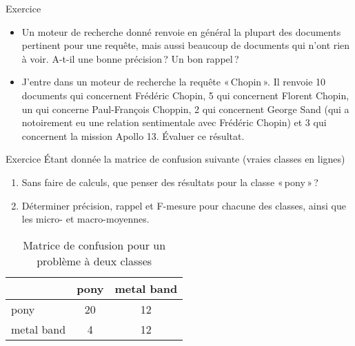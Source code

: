 \documentclass[xcolor={svgnames}, french]{beamer}
\title{\titlepagetitle}
\subtitle{\titlepagesubtitle}
\author{\textbf{\myname} (\mylab)}
\institute{}
\date{\tiny Version {\yyyymmdddate\today}T\currenttime}
\begin{document}

\begin{frame}[plain]
	\titlepage %
\end{frame}


\begin{frame}{Exercice}
	\begin{itemize}
		\item Un moteur de recherche donné renvoie en général la plupart des documents pertinent pour une requête, mais aussi beaucoup de documents qui n'ont rien à voir. A-t-il une bonne précision ? Un bon rappel ?
		\item J'entre dans un moteur de recherche la requête « Chopin ». Il renvoie \num{10} documents qui concernent Frédéric Chopin, \num{5} qui concernent Florent Chopin, un qui concerne Paul-François Choppin, \num{2} qui concernent George Sand (qui a notoirement eu une relation sentimentale avec Frédéric Chopin) et \num{3} qui concernent la mission Apollo 13. Évaluer ce résultat.
	\end{itemize}
\end{frame}

\begin{frame}[fragile=singleslide]{Exercice}
	Étant donnée la matrice de confusion suivante (vraies classes en lignes)
	\begin{enumerate}
		\item Sans faire de calculs, que penser des résultats pour la classe « pony » ?
		\item Déterminer précision, rappel et F-mesure pour chacune des classes, ainsi que les micro- et macro-moyennes.
	\end{enumerate}
	\begin{table}
		\begin{tabu}{|l|*{2}{c|}}
			\hline
						&  pony    & metal band\\
			\hline
			pony        & \num{20} & \num{12}\\
			\hline
			metal band  & \num{4}  & \num{12}\\
			\hline
		\end{tabu}
		\caption{Matrice de confusion pour un problème à deux classes}
	\end{table}

	{\small{}}
\end{frame}

\end{document}
